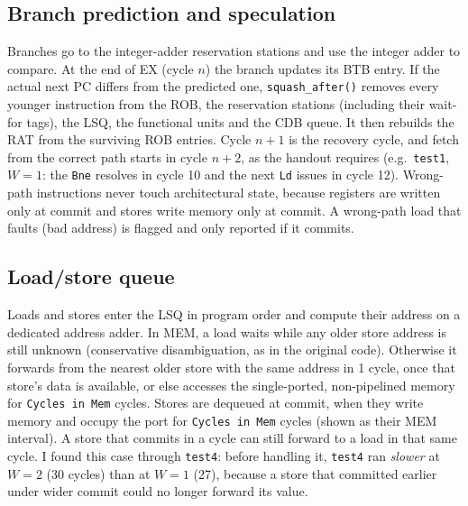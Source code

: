 \documentclass[11pt]{article}
\begin{document}
\subsection{Branch prediction and speculation}
Branches go to the integer-adder reservation stations and use the integer adder to compare. At
the end of EX (cycle $n$) the branch updates its BTB entry. If the actual next PC differs from the
predicted one, \texttt{squash\_after()} removes every younger instruction from the ROB, the
reservation stations (including their wait-for tags), the LSQ, the functional units and the CDB
queue. It then rebuilds the RAT from the surviving ROB entries. Cycle $n{+}1$ is the recovery
cycle, and fetch from the correct path starts in cycle $n{+}2$, as the handout requires (e.g.\
\texttt{test1}, $W{=}1$: the \texttt{Bne} resolves in cycle 10 and the next \texttt{Ld} issues in
cycle 12). Wrong-path instructions never touch architectural state, because registers are
written only at commit and stores write memory only at commit. A wrong-path load that faults (bad
address) is flagged and only reported if it commits.

\subsection{Load/store queue}
Loads and stores enter the LSQ in program order and compute their address on a dedicated
address adder. In MEM, a load waits while any older store address is still unknown
(conservative disambiguation, as in the original code). Otherwise it forwards from the nearest
older store with the same address in 1 cycle, once that store's data is available, or else
accesses the single-ported, non-pipelined memory for \texttt{Cycles in Mem} cycles. Stores are
dequeued at commit, when they write memory and occupy the port for \texttt{Cycles in Mem} cycles
(shown as their MEM interval). A store that commits in a cycle can still forward to a load in that
same cycle. I found this case through \texttt{test4}: before handling it, \texttt{test4} ran
\emph{slower} at $W{=}2$ (30 cycles) than at $W{=}1$ (27), because a store that committed earlier
under wider commit could no longer forward its value.
\end{document}
